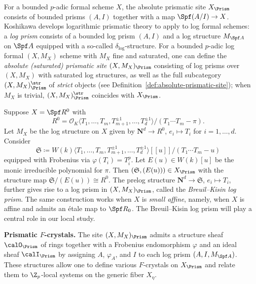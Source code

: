 For a bounded $p$-adic formal scheme $X$, the absolute prismatic site $X_\Prism$ consists of bounded prisms $(A,I)$ together with a map $\Spf (A/I)\rightarrow X$. 
Koshikawa \cite{koshikawa} develops logarithmic prismatic theory to apply to log formal schemes: a \emph{log prism} consists of a bounded log prism $(A,I)$ and a log structure $M_{\Spf A}$ on $\Spf A$ equipped with a so-called $\delta_\log$-structure. For a bounded $p$-adic log formal $(X,M_X)$ scheme with $M_X$ fine and saturated, one can define the \emph{absolute (saturated) prismatic site} $(X,M_X)_\Prism$ consisting of log prisms over $(X,M_X)$ with saturated log structures, as well as the full subcategory $(X,M_X)_\Prism^\str$ of \textit{strict} objects (see Definition~\ref{def:absolute-prismatic-site}); when $M_X$ is trivial, $(X,M_X)_\Prism^\str$ coincides with $X_\Prism$.

\begin{eg}\label{eg:intro-BK-log-prisms}
Suppose $X = \Spf R^0$ with 
\[
R^0 = \mathcal{O}_K \langle T_1, \ldots, T_m, T_{m+1}^{\pm 1}, \ldots, T_d^{\pm 1}\rangle / (T_1\cdots T_m - \pi).
\]
Let $M_X$ be the log structure on $X$ given by $\mathbf{N}^d \rightarrow R^0$, $e_i \mapsto T_i$ for $i = 1, \ldots, d$. Consider 
\[
\mathfrak{S} \coloneqq W(k) \langle T_1, \ldots, T_m, T_{m+1}^{\pm 1}, \ldots, T_d^{\pm 1}\rangle[\![u]\!] / (T_1\cdots T_m - u)
\]
equipped with Frobenius via $\varphi(T_i) = T_i^p$. Let $E(u) \in W(k)[u]$ be the monic irreducible polynomial for $\pi$. Then $(\mathfrak{S}, (E(u))) \in X_{\Prism}$ with the structure map $\mathfrak{S}/(E(u)) \cong R^0$. The prelog structure $\mathbf{N}^d \rightarrow \mathfrak{S}$, $e_i \mapsto T_i$, further gives rise to a log prism in $(X, M_X)_{\Prism}$, called the \emph{Breuil--Kisin log prism}. The same construction works when $X$ is \emph{small affine}, namely, when $X$ is affine and admits an \'etale map to $\Spf R_0$.
The Breuil--Kisin log prism will play a central role in our local study.   
\end{eg}

\medskip \noindent
\textbf{Prismatic $F$-crystals.}
The site $(X,M_X)_\Prism$ admits a structure sheaf $\calO_\Prism$ of rings together with a Frobenius endomorphism $\varphi$ and an ideal sheaf $\calI_\Prism$ by assigning $A$, $\varphi_A$, and $I$ to each log prism $(A,I, M_{\Spf A})$. These structures allow one to define various $F$-crystals on $X_\Prism$ and relate them to $\Z_p$-local systems on the generic fiber $X_\eta$.

